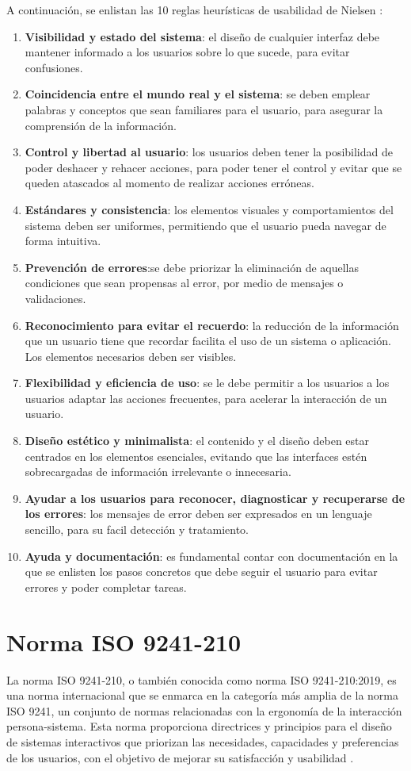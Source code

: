 A continuación, se enlistan las 10 reglas heurísticas de usabilidad de Nielsen \cite{ref61}:
\begin{enumerate}
    \item \textbf{Visibilidad y estado del sistema}: el diseño de cualquier interfaz debe mantener informado a los usuarios sobre lo que sucede, para evitar confusiones.
    \item \textbf{Coincidencia entre el mundo real y el sistema}: se deben emplear palabras y conceptos que sean familiares para el usuario, para asegurar la comprensión de la información.
    \item \textbf{Control y libertad al usuario}: los usuarios deben tener la posibilidad de poder deshacer y rehacer acciones, para poder tener el control y evitar que se queden atascados al momento de realizar acciones erróneas.
    \item \textbf{Estándares y consistencia}: los elementos visuales y comportamientos del sistema deben ser uniformes, permitiendo que el usuario pueda navegar de forma intuitiva.
    \item \textbf{Prevención de errores}:se debe priorizar la eliminación de aquellas condiciones que sean propensas al error, por medio de mensajes o validaciones.
    \item \textbf{Reconocimiento para evitar el recuerdo}: la reducción de la información que un usuario tiene que recordar facilita el uso de un sistema o aplicación. Los elementos necesarios deben ser visibles.
    \item \textbf{Flexibilidad y eficiencia de uso}: se le debe permitir a los usuarios a los usuarios adaptar las acciones frecuentes, para acelerar la interacción de un usuario.
    \item \textbf{Diseño estético y minimalista}: el contenido y el diseño deben estar centrados en los elementos esenciales, evitando que las interfaces estén sobrecargadas de información irrelevante o innecesaria.
    \item \textbf{Ayudar a los usuarios para reconocer, diagnosticar y recuperarse de los errores}: los mensajes de error deben ser expresados en un lenguaje sencillo, para su facil detección y tratamiento.
    \item \textbf{Ayuda y documentación}: es fundamental contar con documentación en la que se enlisten los pasos concretos que debe seguir el usuario para evitar errores y poder completar tareas.
\end{enumerate}

\section{Norma ISO 9241-210}
La norma ISO 9241-210, o también conocida como norma ISO 9241-210:2019, es una norma internacional que se enmarca en la categoría más amplia de la norma ISO 9241, un conjunto de normas relacionadas con la ergonomía de la interacción persona-sistema. Esta norma proporciona directrices y principios para el diseño de sistemas interactivos que priorizan las necesidades, capacidades y preferencias de los usuarios, con el objetivo de mejorar su satisfacción y usabilidad \cite{ref62}.\\

